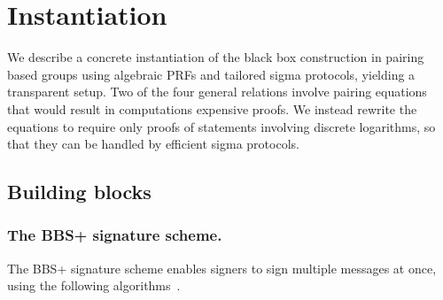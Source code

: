 \section{Instantiation}\label{sec:txid-instantiation}

We describe a concrete instantiation of the black box construction in pairing
based groups using algebraic PRFs and tailored sigma protocols, yielding a
transparent setup. Two of the four general relations involve pairing equations
that would result in computations expensive proofs. We instead rewrite the
equations to require only proofs of statements involving discrete logarithms,
so that they can be handled by efficient sigma protocols.

\subsection{Building blocks}

\subsubsection{The BBS+ signature scheme.} The BBS+ signature scheme enables
signers to sign multiple messages at once, using the following
algorithms~\cite{C:BonBoySha04,SCN:AuSusMu06,EPRINT:CamDriLeh16}.

